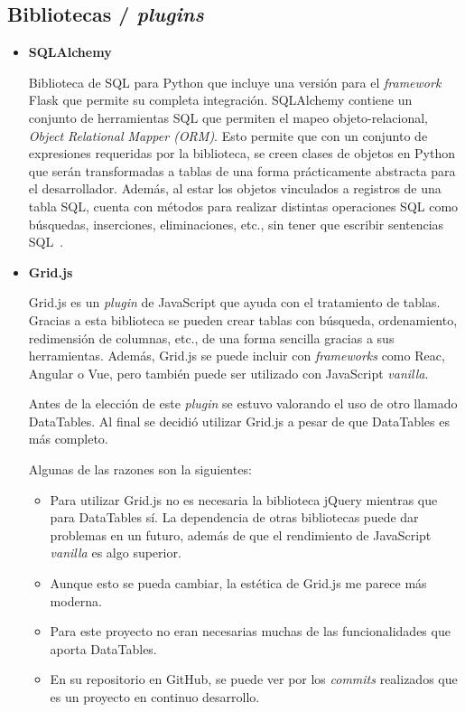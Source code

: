 \subsection{Bibliotecas / \textit{plugins}}
\begin{itemize}
\item\textbf{SQLAlchemy}

Biblioteca de SQL para Python que incluye una versión para el \textit{framework} Flask que permite su completa integración. 
SQLAlchemy contiene un conjunto de herramientas SQL que permiten el mapeo objeto-relacional, \textit{Object Relational Mapper (ORM)}. 
Esto permite que con un conjunto de expresiones requeridas por la biblioteca, se creen clases de objetos en Python que serán transformadas a tablas de una forma prácticamente abstracta para el desarrollador. 
Además, al estar los objetos vinculados a registros de una tabla SQL, cuenta con métodos para realizar distintas operaciones SQL como búsquedas, inserciones, eliminaciones, etc., sin tener que escribir sentencias SQL~\cite{sqlAlchemy}.

\item\textbf{Grid.js}

Grid.js es un \textit{plugin} de JavaScript que ayuda con el tratamiento de tablas. 
Gracias a esta biblioteca se pueden crear tablas con búsqueda, ordenamiento, redimensión de columnas, etc., de una forma sencilla gracias a sus herramientas. 
Además, Grid.js se puede incluir con \textit{frameworks} como Reac, Angular o Vue, pero también puede ser utilizado con JavaScript \textit{vanilla}.


Antes de la elección de este \textit{plugin} se estuvo valorando el uso de otro llamado DataTables. Al final se decidió utilizar Grid.js a pesar de que DataTables es más completo.

Algunas de las razones son la siguientes:
\begin{itemize}
\item Para utilizar Grid.js no es necesaria la biblioteca jQuery mientras que para DataTables sí. La dependencia de otras bibliotecas puede dar problemas en un futuro, además de que el rendimiento de JavaScript \textit{vanilla} es algo superior.
\item Aunque esto se pueda cambiar, la estética de Grid.js me parece más moderna.
\item Para este proyecto no eran necesarias muchas de las funcionalidades que aporta DataTables.
\item En su repositorio en GitHub, se puede ver por los \textit{commits} realizados que es un proyecto en continuo desarrollo.
\end{itemize}
\end{itemize}

